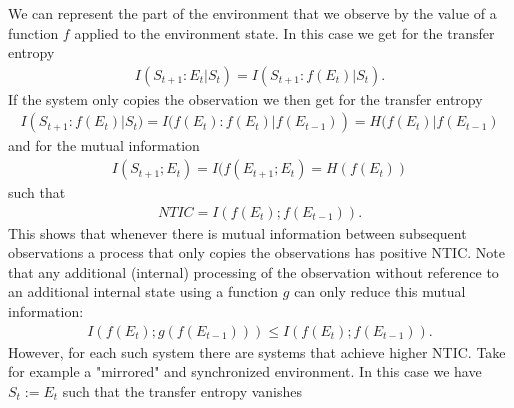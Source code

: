 \documentclass[utf8]{article}
\begin{document}
            
            We can represent the part of the environment that we observe by the value of a function $f$ applied to the environment state. In this case we get for the transfer entropy
            \begin{align}
             I(S_{t+1}:E_t|S_t)=I(S_{t+1}:f(E_t)|S_t).
            \end{align}
            If the system only copies the observation we then get for the transfer entropy
            \begin{align}
             I(S_{t+1}:f(E_t)|S_t)=I(f(E_t):f(E_t)|f(E_{t-1}))=H(f(E_t)|f(E_{t-1})
            \end{align}
            and for the mutual information
            \begin{align}
             I(S_{t+1};E_t)=I(f(E_{t+1};E_t)=H(f(E_t))
            \end{align}
            such that 
            \begin{align}
                NTIC=I(f(E_t);f(E_{t-1})).
            \end{align}
            This shows that whenever there is mutual information between subsequent observations a process that only copies the observations has positive NTIC. Note that any additional (internal) processing of the observation without reference to an additional internal state using a function $g$ can only reduce this mutual information:
            \begin{align}
               I(f(E_t);g(f(E_{t-1})))\leq I(f(E_t);f(E_{t-1})).
            \end{align}
            However, for each such system there are systems that achieve higher NTIC. Take for example a "mirrored" and synchronized environment. In this case we have $S_t:=E_t$ such that the transfer entropy vanishes
\end{document}
